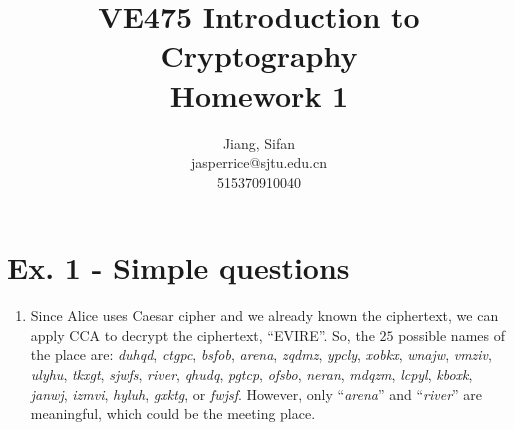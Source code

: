 \documentclass[11pt,a4paper]{article}
\title{	
	VE475 Introduction to Cryptography \\
	Homework 1
}
\author{
	Jiang, Sifan\\
	jasperrice@sjtu.edu.cn\\
	515370910040
}
\begin{document}
\maketitle

\section*{Ex. 1 - Simple questions}
\begin{enumerate}
	\item Since Alice uses Caesar cipher and we already known the ciphertext, we can apply CCA to decrypt the ciphertext, ``EVIRE''. So, the $25$ possible names of the place are: \textit{duhqd}, \textit{ctgpc}, \textit{bsfob}, \textit{arena}, \textit{zqdmz}, \textit{ypcly}, \textit{xobkx}, \textit{wnajw}, \textit{vmziv}, \textit{ulyhu}, \textit{tkxgt}, \textit{sjwfs}, \textit{river}, \textit{qhudq}, \textit{pgtcp}, \textit{ofsbo}, \textit{neran}, \textit{mdqzm}, \textit{lcpyl}, \textit{kboxk}, \textit{janwj}, \textit{izmvi}, \textit{hyluh}, \textit{gxktg}, or \textit{fwjsf}. However, only ``\textit{arena}'' and ``\textit{river}'' are meaningful, which could be the meeting place.
	

\end{enumerate}
\end{document}
